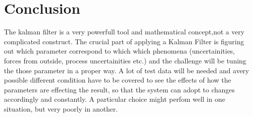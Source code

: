 \chapter{Conclusion}
The kalman filter is a very powerfull tool and mathematical concept,not a very complicated construct. The crucial part of applying a Kalman Filter is figuring out which parameter correspond to which which phenomena (uncertainities, forces from outside, process uncertainities etc.) and the challenge will be tuning the those parameter in a proper way. A lot of test data will be needed and avery possible different condition have to be covered to see the effects of how the parameters are effecting the result, so that the system can adopt to changes accordingly and constantly. A particular choice might perfom well in one situation, but very poorly in another. 










